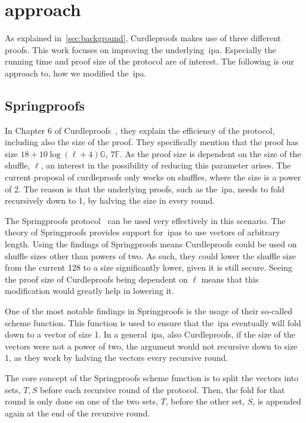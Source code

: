 \section{approach}\label{sec:approach}

As explained in~\autoref{sec:background}, Curdleproofs makes use of three different proofs.
This work focuses on improving the underlying~\gls{ipa}.
Especially the running time and proof size of the protocol are of interest.
The following is our approach to, how we modified the~\gls{ipa}.

\subsection{Springproofs}\label{sec:approach-springproofs}
In Chapter 6 of Curdleproofs~\cite{Curdleproofs}, they explain the efficiency of the protocol, including also the size of the proof.
They specifically mention that the proof has size $18+10 \log(\ell+4)\mathbb{G}$, $7\mathbb{F}$.
As the proof size is dependent on the size of the shuffle, $\ell$, an interest in the possibility of reducing this parameter arises.
The current proposal of curdleproofs only works on shuffles, where the size is a power of 2.
The reason is that the underlying proofs, such as the~\gls{ipa}, needs to fold recursively down to 1, by halving the size in every round.

The Springproofs protocol~\cite{zhang2024springproofs} can be used very effectively in this scenario.
The theory of Springproofs provides support for~\glspl{ipa} to use vectors of arbitrary length.
Using the findings of Springproofs means Curdleproofs could be used on shuffle sizes other than powers of two.
As such, they could lower the shuffle size from the current 128 to a size significantly lower, given it is still secure.
Seeing the proof size of Curdleproofs being dependent on $\ell$ means that this modification would greatly help in lowering it.

One of the most notable findings in Springproofs is the usage of their so-called scheme function.
This function is used to ensure that the~\gls{ipa} eventually will fold down to a vector of size 1.
In a general~\gls{ipa}, also Curdleproofs, if the size of the vectors were not a power of two, the argument would not recursive down to size 1, as they work by halving the vectors every recursive round.


The core concept of the Springproofs scheme function is to split the vectors into sets, $T,S$ before each recursive round of the protocol.
Then, the fold for that round is only done on one of the two sets, $T$, before the other set, $S$, is appended again at the end of the recursive round.

